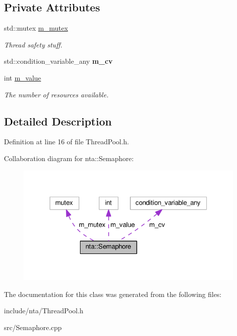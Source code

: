 \subsection*{Private Attributes}
\begin{DoxyCompactItemize}
\item 
\mbox{\label{classnta_1_1Semaphore_a8d8b01eadcd3dae216dd6c5637ae1e25}} 
std\+::mutex \hyperlink{classnta_1_1Semaphore_a8d8b01eadcd3dae216dd6c5637ae1e25}{m\+\_\+mutex}
\begin{DoxyCompactList}\small\item\em Thread safety stuff. \end{DoxyCompactList}\item 
\mbox{\label{classnta_1_1Semaphore_af76e62b72945c84ef29d76bb770638c1}} 
std\+::condition\+\_\+variable\+\_\+any {\bfseries m\+\_\+cv}
\item 
\mbox{\label{classnta_1_1Semaphore_ab1cca03e13d17642cb0386f7e17a80a1}} 
int \hyperlink{classnta_1_1Semaphore_ab1cca03e13d17642cb0386f7e17a80a1}{m\+\_\+value}
\begin{DoxyCompactList}\small\item\em The number of resources available. \end{DoxyCompactList}\end{DoxyCompactItemize}


\subsection{Detailed Description}


Definition at line 16 of file Thread\+Pool.\+h.



Collaboration diagram for nta\+:\+:Semaphore\+:
\nopagebreak
\begin{figure}[H]
\begin{center}
\leavevmode
\includegraphics[width=318pt]{d7/d83/classnta_1_1Semaphore__coll__graph}
\end{center}
\end{figure}


The documentation for this class was generated from the following files\+:\begin{DoxyCompactItemize}
\item 
include/nta/Thread\+Pool.\+h\item 
src/Semaphore.\+cpp\end{DoxyCompactItemize}
